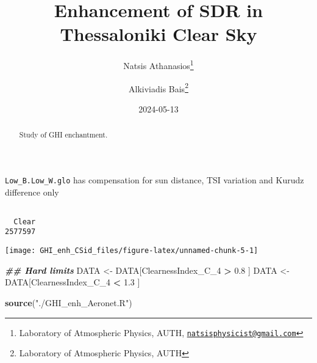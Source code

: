 \documentclass[
  10pt,
  a4paper,oneside]{article}
\title{Enhancement of SDR in Thessaloniki Clear Sky}
\author{Natsis Athanasios\footnote{Laboratory of Atmospheric Physics, AUTH, \href{mailto:natsisphysicist@gmail.com}{\nolinkurl{natsisphysicist@gmail.com}}} \and Alkiviadis Bais\footnote{Laboratory of Atmospheric Physics, AUTH}}
\date{2024-05-13}
\newenvironment{Shaded}{\begin{snugshade}}{\end{snugshade}}
\newcommand{\DocumentationTok}[1]{\textcolor[rgb]{0.56,0.35,0.01}{\textbf{\textit{#1}}}}
\newcommand{\FloatTok}[1]{\textcolor[rgb]{0.00,0.00,0.81}{#1}}
\newcommand{\FunctionTok}[1]{\textcolor[rgb]{0.13,0.29,0.53}{\textbf{#1}}}
\newcommand{\NormalTok}[1]{#1}
\newcommand{\OtherTok}[1]{\textcolor[rgb]{0.56,0.35,0.01}{#1}}
\newcommand{\SpecialCharTok}[1]{\textcolor[rgb]{0.81,0.36,0.00}{\textbf{#1}}}
\newcommand{\StringTok}[1]{\textcolor[rgb]{0.31,0.60,0.02}{#1}}
\begin{document}
\maketitle
\begin{abstract}
Study of GHI enchantment.
\end{abstract}

{
\hypersetup{linkcolor=}
\setcounter{tocdepth}{4}
\tableofcontents
}
\texttt{Low\_B.Low\_W.glo} has compensation for sun distance, TSI variation and Kurudz difference only

\begin{Shaded}
\end{Shaded}

\begin{verbatim}

  Clear 
2577597 
\end{verbatim}

\begin{Shaded}
\end{Shaded}

\begin{center}\texttt{[image: GHI\_enh\_CSid\_files/figure-latex/unnamed-chunk-5-1]} \end{center}

\begin{Shaded}
\begin{Highlighting}[]
\DocumentationTok{\#\# Hard limits}
\NormalTok{DATA }\OtherTok{\textless{}{-}}\NormalTok{ DATA[ClearnessIndex\_C\_4 }\SpecialCharTok{\textgreater{}} \FloatTok{0.8}\NormalTok{ ]}
\NormalTok{DATA }\OtherTok{\textless{}{-}}\NormalTok{ DATA[ClearnessIndex\_C\_4 }\SpecialCharTok{\textless{}} \FloatTok{1.3}\NormalTok{ ]}

\FunctionTok{source}\NormalTok{(}\StringTok{"./GHI\_enh\_Aeronet.R"}\NormalTok{)}
\end{Highlighting}
\end{Shaded}
\end{document}
